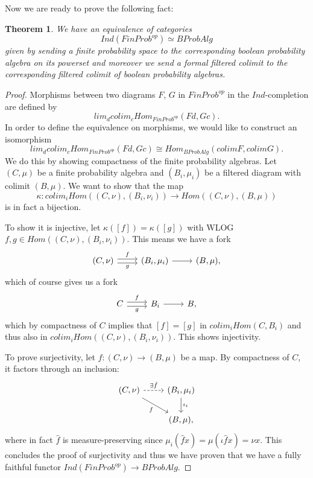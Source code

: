 \documentclass[a4paper,draft]{amsproc}
\theoremstyle{plain}
\newtheorem{theorem}{Theorem}[section]
\theoremstyle{definition}
\theoremstyle{remark}
\numberwithin{equation}{section}
\begin{document}
Now we are ready to prove the following fact:

\begin{theorem} We have an equivalence of categories
\[
Ind(FinProb^{op}) \simeq BProbAlg
\]
given by sending a finite probability space to the corresponding boolean probability algebra on its powerset and moreover we send a formal filtered colimit to the corresponding filtered colimit of boolean probability algebras.
\end{theorem}
\begin{proof}
Morphisms between two diagrams $F$, $G$ in $FinProb^{op}$ in the $Ind$-completion are defined by
\[
lim_d colim_c Hom_{FinProb^{op}}(F d, G c).
\]
In order to define the equivalence on morphisms, we would like to construct an isomorphism
\[
lim_d colim_c Hom_{FinProb^{op}}(F d, G c) \cong Hom_{BProbAlg}(colim F, colim G).
\]
We do this by showing compactness of the finite probability algebras. Let $(C, \mu)$ be a finite probability algebra and $(B_i, \mu_i)$ be a filtered diagram with colimit $(B, \mu)$. We want to show that the map
\[
\kappa: colim_i Hom((C, \nu), (B_i, \nu_i)) \to Hom((C,\nu), (B,\mu))
\]
is in fact a bijection.

To show it is injective, let $\kappa([f]) = \kappa([g])$ with WLOG $f,g \in Hom((C,\nu), (B_i, \nu_i))$. This means we have a fork
\[
\begin{tikzcd}
{(C,\nu)} \arrow[r, "f", shift left] \arrow[r, "g"', shift right] & {(B_i,\mu_i)} \arrow[r] & {(B,\mu)},
\end{tikzcd}
\]
which of course gives us a fork
\[
\begin{tikzcd}
C \arrow[r, "f", shift left] \arrow[r, "g"', shift right] & B_i \arrow[r] & B,
\end{tikzcd}
\]
which by compactness of $C$ implies that $[f] = [g]$ in $colim_i Hom(C,B_i)$ and thus also in $colim_i Hom((C,\nu), (B_i, \nu_i))$. This shows injectivity.

To prove surjectivity, let $f:(C, \nu) \to (B,\mu)$ be a map. By compactness of $C$, it factors through an inclusion:
\[
\begin{tikzcd}
{(C,\nu)} \arrow[r, "\exists \hat{f}", dashed] \arrow[rd, "f"'] & {(B_i,\mu_i)} \arrow[d, "\iota_i"] \\
                                                                & {(B,\mu)}                         ,
\end{tikzcd}
\]
where in fact $\hat{f}$ is measure-preserving since $\mu_i(\hat{f} x) = \mu(\iota \hat{f} x) = \nu x$. This concludes the proof of surjectivity and thus we have proven that we have a fully faithful functor $Ind(FinProb^{op}) \to BProbAlg$.


\end{proof}
\end{document}

